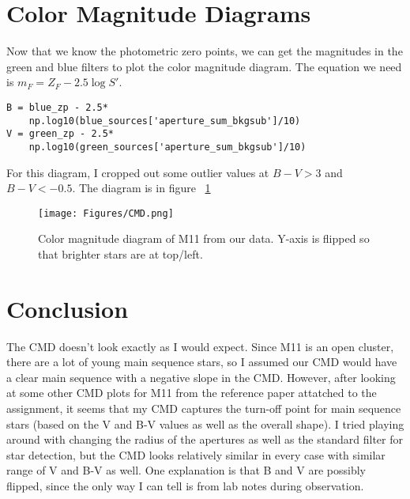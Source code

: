 \documentclass[twocolumn]{article}
\begin{document}
\section{Color Magnitude Diagrams}
Now that we know the photometric zero points, we can get the magnitudes in the green and blue filters to plot the color magnitude diagram. The equation we need is $m_F = Z_F - 2.5\log S\prime$. 
\begin{verbatim}
B = blue_zp - 2.5*
    np.log10(blue_sources['aperture_sum_bkgsub']/10)
V = green_zp - 2.5*
    np.log10(green_sources['aperture_sum_bkgsub']/10)
\end{verbatim}
For this diagram, I cropped out some outlier values at $B-V > 3$ and $B-V < -0.5$. The diagram is in figure ~\ref{fig:cmd}
\begin{figure}[h!]
    \texttt{[image: Figures/CMD.png]}
    \caption{Color magnitude diagram of M11 from our data. Y-axis is flipped so that brighter stars are at top/left.}
    \label{fig:cmd}
\end{figure}

\section{Conclusion}
The CMD doesn't look exactly as I would expect. Since M11 is an open cluster, there are a lot of young main sequence stars, so I assumed our CMD would have a clear main sequence with a negative slope in the CMD. However, after looking at some other CMD plots for M11 from the reference paper attatched to the assignment, it seems that my CMD captures the turn-off point for main sequence stars (based on the V and B-V values as well as the overall shape). I tried playing around with changing the radius of the apertures as well as the standard filter for star detection, but the CMD looks relatively similar in every case with similar range of V and B-V as well. One explanation is that B and V are possibly flipped, since the only way I can tell is from lab notes during observation. 
\end{document}

